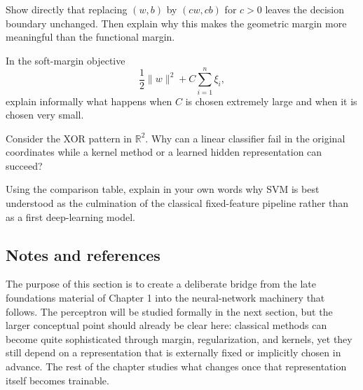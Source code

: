 \begin{exercise}
Show directly that replacing $(w,b)$ by $(cw,cb)$ for $c>0$ leaves the decision boundary unchanged. Then explain why this makes the geometric margin more meaningful than the functional margin.
\end{exercise}

\begin{exercise}
In the soft-margin objective
\[
\frac12\|w\|^2 + C\sum_{i=1}^n \xi_i,
\]
explain informally what happens when $C$ is chosen extremely large and when it is chosen very small.
\end{exercise}

\begin{exercise}
Consider the XOR pattern in $\mathbb R^2$. Why can a linear classifier fail in the original coordinates while a kernel method or a learned hidden representation can succeed?
\end{exercise}

\begin{exercise}
Using the comparison table, explain in your own words why SVM is best understood as the culmination of the classical fixed-feature pipeline rather than as a first deep-learning model.
\end{exercise}

\subsection*{Notes and references}

The purpose of this section is to create a deliberate bridge from the late foundations material of Chapter 1 into the neural-network machinery that follows. The perceptron will be studied formally in the next section, but the larger conceptual point should already be clear here: classical methods can become quite sophisticated through margin, regularization, and kernels, yet they still depend on a representation that is externally fixed or implicitly chosen in advance. The rest of the chapter studies what changes once that representation itself becomes trainable.
